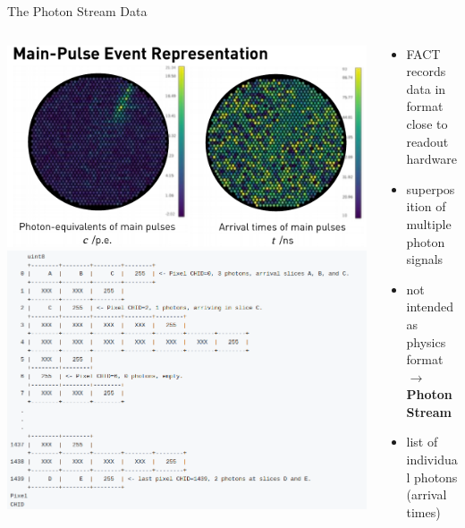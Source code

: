 \begin{frame}[t]{The Photon Stream Data}
\begin{columns}[onlytextwidth]
    \begin{column}{0.475\textwidth}
        \begin{overprint}
              \vspace*{\fill}\includegraphics[width=\textwidth]{fig/standard.png}
              \vspace*{\fill}\includegraphics[width=\textwidth]{fig/lol.png}
        \end{overprint}
  \end{column}
  \begin{column}{0.475\textwidth}
      \begin{itemize}
          \item FACT records data in format close to readout hardware
          \item superposition of multiple photon signals
          \item not intended as physics format \\ $\rightarrow$ \textbf{Photon Stream}
          \item list of individual photons (arrival times)
      \end{itemize}
  \end{column}
\end{columns}

\end{frame}

